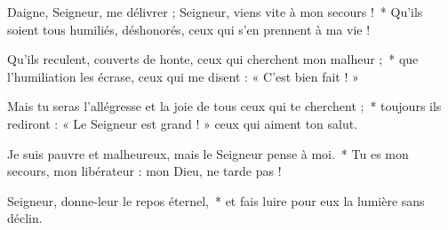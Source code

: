 \item Daigne, Seigneur, me délivrer ; Seigneur, viens vite à mon secours !~* Qu'ils soient tous humiliés, déshonorés, ceux qui s'en prennent à ma vie !

\item Qu'ils reculent, couverts de honte, ceux qui cherchent mon malheur ;~* que l'humiliation les écrase, ceux qui me disent : « C'est bien fait ! »

\item Mais tu seras l'allégresse et la joie de tous ceux qui te cherchent ;~* toujours ils rediront : « Le Seigneur est grand ! » ceux qui aiment ton salut.

\item Je suis pauvre et malheureux, mais le Seigneur pense à moi.~* Tu es mon secours, mon libérateur : mon Dieu, ne tarde pas !

\item Seigneur, donne-leur le repos éternel,~* et fais luire pour eux la lumière sans déclin.